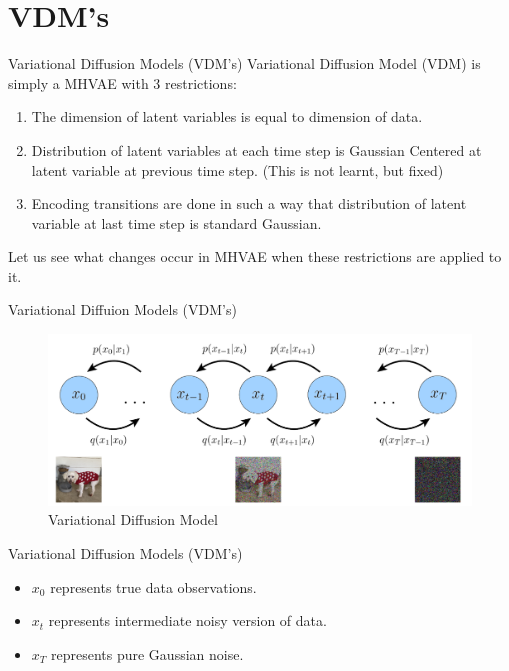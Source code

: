 \section*{VDM's}
\begin{frame}{Variational Diffusion Models (VDM's)}
    Variational Diffusion Model (VDM) is simply a MHVAE with 3 restrictions:
    \begin{enumerate}
        \item The dimension of latent variables is equal to dimension of data.
        \item Distribution of latent variables at each time step is Gaussian Centered at latent variable at previous time step. (This is not learnt, but fixed)
        \item Encoding transitions are done in such a way that distribution of latent variable at last time step is standard Gaussian.
    \end{enumerate}

    Let us see what changes occur in MHVAE when these restrictions are applied to it.
\end{frame}

\begin{frame}{Variational Diffuion Models (VDM's)}
    \begin{figure}
        \centering
        \includegraphics[width=1\textwidth]{Images/vdm1.png}
        \caption{Variational Diffusion Model}
    \end{figure}
\end{frame}

\begin{frame}{Variational Diffusion Models (VDM's)}
    \begin{itemize}
        \item $x_0$ represents true data observations.
        \item $x_t$ represents intermediate noisy version of data.
        \item $x_T$ represents pure Gaussian noise.
    \end{itemize}
\end{frame}

